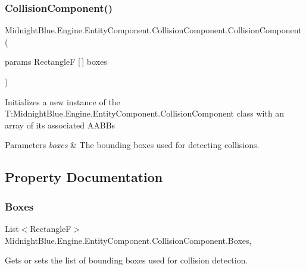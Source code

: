\subsubsection{\texorpdfstring{Collision\+Component()}{CollisionComponent()}}
{\footnotesize\ttfamily Midnight\+Blue.\+Engine.\+Entity\+Component.\+Collision\+Component.\+Collision\+Component (\begin{DoxyParamCaption}\item[{params RectangleF \mbox{[}$\,$\mbox{]}}]{boxes }\end{DoxyParamCaption})\hspace{0.3cm}{\ttfamily [inline]}}



Initializes a new instance of the T\+:\+Midnight\+Blue.\+Engine.\+Entity\+Component.\+Collision\+Component class with an array of its associated A\+A\+BB\textquotesingle{}s 


\begin{DoxyParams}{Parameters}
{\em boxes} & The bounding boxes used for detecting collisions.\\
\hline
\end{DoxyParams}


\subsection{Property Documentation}
\hypertarget{class_midnight_blue_1_1_engine_1_1_entity_component_1_1_collision_component_a013ef17544e90c756f0f34fe7d10232a}{}\label{class_midnight_blue_1_1_engine_1_1_entity_component_1_1_collision_component_a013ef17544e90c756f0f34fe7d10232a} 
\subsubsection{\texorpdfstring{Boxes}{Boxes}}
{\footnotesize\ttfamily List$<$RectangleF$>$ Midnight\+Blue.\+Engine.\+Entity\+Component.\+Collision\+Component.\+Boxes\hspace{0.3cm}{\ttfamily [get]}, {\ttfamily [set]}}



Gets or sets the list of bounding boxes used for collision detection. 

